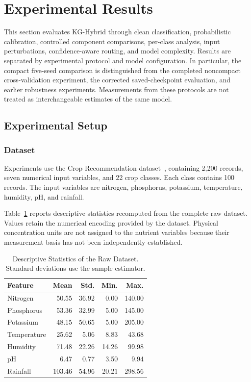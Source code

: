 \section{Experimental Results}
\label{sec:experimental_results}

This section evaluates KG-Hybrid through clean classification,
probabilistic calibration, controlled component comparisons, per-class
analysis, input perturbations, confidence-aware routing, and model
complexity. Results are separated by experimental protocol and model
configuration. In particular, the compact five-seed comparison is
distinguished from the completed noncompact cross-validation experiment,
the corrected saved-checkpoint evaluation, and earlier robustness
experiments. Measurements from these protocols are not treated as
interchangeable estimates of the same model.

\subsection{Experimental Setup}

\subsubsection{Dataset}

Experiments use the Crop Recommendation
dataset~\cite{cropdataset}, containing 2,200 records, seven numerical
input variables, and 22 crop classes. Each class contains 100 records.
The input variables are nitrogen, phosphorus, potassium, temperature,
humidity, pH, and rainfall.

Table~\ref{tab:dataset_stats} reports descriptive statistics recomputed
from the complete raw dataset. Values retain the numerical encoding
provided by the dataset. Physical concentration units are not assigned
to the nutrient variables because their measurement basis has not been
independently established.

\begin{table}[t]
\centering
\caption{Descriptive Statistics of the Raw Dataset.
Standard deviations use the sample estimator.}
\label{tab:dataset_stats}
\small
\begin{tabular}{lrrrr}
\hline
Feature & Mean & Std. & Min. & Max. \\
\hline
Nitrogen    & 50.55  & 36.92 & 0.00  & 140.00 \\
Phosphorus  & 53.36  & 32.99 & 5.00  & 145.00 \\
Potassium   & 48.15  & 50.65 & 5.00  & 205.00 \\
Temperature & 25.62  & 5.06  & 8.83  & 43.68  \\
Humidity    & 71.48  & 22.26 & 14.26 & 99.98  \\
pH          & 6.47   & 0.77  & 3.50  & 9.94   \\
Rainfall    & 103.46 & 54.96 & 20.21 & 298.56 \\
\hline
\end{tabular}
\end{table}


